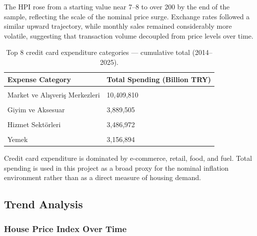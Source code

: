 \documentclass[
  11pt,
  a4paper,
]{article}
\begin{document}
\endgroup{}

The HPI rose from a starting value near 7--8 to over 200 by the end of
the sample, reflecting the scale of the nominal price surge. Exchange
rates followed a similar upward trajectory, while monthly sales remained
considerably more volatile, suggesting that transaction volume decoupled
from price levels over time.

\begingroup\fontsize{9}{11}\selectfont

\begin{longtable}[t]{ll}

\caption{\label{tbl-top-categories}Top 8 credit card expenditure
categories --- cumulative total (2014--2025).}

\tabularnewline

\toprule
Expense Category & Total Spending (Billion TRY)\\
\midrule
\cellcolor{gray!10}{E-Alışveriş} & \cellcolor{gray!10}{15,913,640}\\
Market ve Alışveriş Merkezleri & 10,409,810\\
\cellcolor{gray!10}{Çeşitli Gıda} & \cellcolor{gray!10}{3,892,815}\\
Giyim ve Aksesuar & 3,889,505\\
\cellcolor{gray!10}{Benzin ve Yakıt İstasyonları} & \cellcolor{gray!10}{3,542,543}\\
\addlinespace
Hizmet Sektörleri & 3,486,972\\
\cellcolor{gray!10}{Elektrik-Elektronik Eşya / Bilgisayar} & \cellcolor{gray!10}{3,308,526}\\
Yemek & 3,156,894\\
\bottomrule

\end{longtable}

\endgroup{}

Credit card expenditure is dominated by e-commerce, retail, food, and
fuel. Total spending is used in this project as a broad proxy for the
nominal inflation environment rather than as a direct measure of housing
demand.

\subsection{Trend Analysis}\label{trend-analysis}

\subsubsection{House Price Index Over
Time}\label{house-price-index-over-time}
\end{document}
